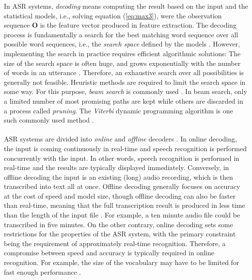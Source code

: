 \documentclass[english, 12pt, a4paper, pdftex, elec, utf8]{aaltothesis}
\begin{document}
In ASR systems, \textit{decoding} means computing the result based on the input and the statistical models, i.e., solving equation (\ref{eq:max3}), were the observation sequence $\bm{O}$ is the feature vector produced in feature extraction. The decoding process is fundamentally a search for the best matching word sequence over all possible word sequences, i.e., the \textit{search space} defined by the models \cite{pylkkonen2013towards}. However, implementing the search in practice requires efficient algorithmic solutions: The size of the search space is often huge, and grows exponentially with the number of words in an utterance \cite{pylkkonen2013towards}. Therefore, an exhaustive search over all possibilities is generally not feasible. Heuristic methods are required to limit the search space in some way. For this purpose, \textit{beam search} is commonly used \cite{pylkkonen2013towards, hori2013speech}. In beam search, only a limited number of most promising paths are kept while others are discarded in a process called \textit{pruning}. The \textit{Viterbi} dynamic programming algorithm is one such commonly used method \cite{huang2001spoken, yu2014automatic, hori2013speech}. \\\\
ASR systems are divided into \textit{online} and \textit{offline} decoders \cite{alumae2014full}. In online decoding, the input is coming continuously in real-time and speech recognition is performed concurrently with the input. In other words, speech recognition is performed in real-time and the results are typically displayed immediately. Conversely, in offline decoding the input is an existing (long) audio recording, which is then transcribed into text all at once. Offline decoding generally focuses on accuracy at the cost of speed and model size, though offline decoding can also be faster than real-time, meaning that the full transcription result is produced in less time than the length of the input file \cite{alumae2014recent}. For example, a ten minute audio file could be transcribed in five minutes. On the other contrary, online decoding sets some restrictions for the properties of the ASR system, with the primary constraint being the requirement of approximately real-time recognition. Therefore, a compromise between speed and accuracy is typically required in online recognition. For example, the size of the vocabulary may have to be limited for fast enough performance \cite{mcgraw2016personalized, enarvi2017automatic}. \\\\
\end{document}
